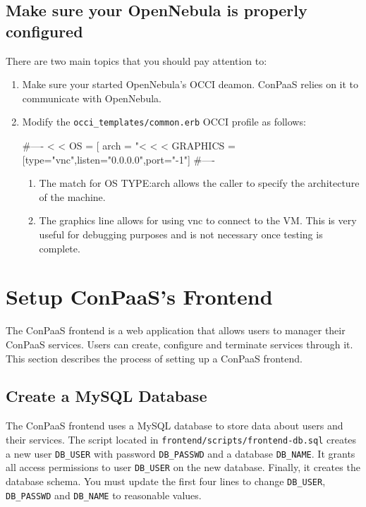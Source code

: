 \documentclass[10pt]{article}
\begin{document}
\subsection{Make sure your OpenNebula is properly configured}

There are two main topics that you should pay attention to:

\begin{enumerate}
\item Make sure your started OpenNebula's OCCI deamon. ConPaaS relies
  on it to communicate with OpenNebula.
\item Modify the \verb+occi_templates/common.erb+ OCCI profile as follows:
  \begin{code}
#----
<%
        <%
          OS = [ arch = "<%
        <%
<%
GRAPHICS = [type="vnc",listen="0.0.0.0",port="-1"]
#----    
  \end{code}
  \begin{enumerate}
  \item The match for OS TYPE:arch allows the caller to specify the
    architecture of the machine.
  \item The graphics line allows for using vnc to connect to the VM.
    This is very useful for debugging purposes and is not necessary
    once testing is complete.
  \end{enumerate}
\end{enumerate}

\section{Setup ConPaaS's Frontend}

The ConPaaS frontend is a web application that allows users to manager
their ConPaaS services. Users can create, configure and terminate
services through it. This section describes the process of setting up
a ConPaaS frontend.


\subsection{Create a MySQL Database}

The ConPaaS frontend uses a MySQL database to store data about users
and their services. The script located in
\verb+frontend/scripts/frontend-db.sql+ creates a new user
\verb+DB_USER+ with password \verb+DB_PASSWD+ and a database
\verb+DB_NAME+. It grants all access permissions to user
\verb+DB_USER+ on the new database. Finally, it creates the database
schema. You must update the first four lines to change \verb+DB_USER+,
\verb+DB_PASSWD+ and \verb+DB_NAME+ to reasonable values.
\end{document}
